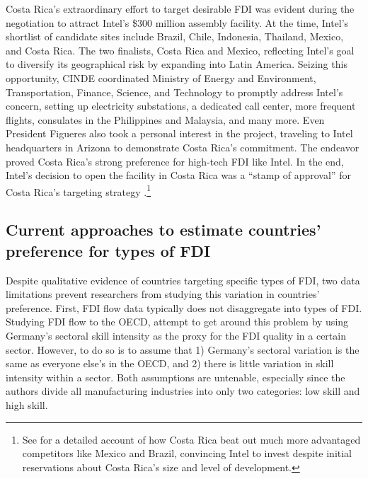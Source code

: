 Costa Rica's extraordinary effort to target desirable FDI was evident during the
negotiation to attract Intel's \$300 million assembly facility. At the time,
Intel's shortlist of candidate sites include Brazil, Chile, Indonesia, Thailand,
Mexico, and Costa Rica. The two finalists, Costa Rica and Mexico, reflecting
Intel's goal to diversify its geographical risk by expanding into Latin America.
Seizing this opportunity, CINDE coordinated Ministry of Energy and Environment,
Transportation, Finance, Science, and Technology to promptly address Intel's
concern, setting up electricity substations, a dedicated call center,
more frequent flights, consulates in the Philippines and Malaysia, and many
more. Even President Figueres also took a personal interest in the project,
traveling to Intel headquarters in Arizona to demonstrate Costa Rica's
commitment. The endeavor proved Costa Rica's strong preference for high-tech FDI
like Intel. In the end, Intel's decision to open the facility in Costa Rica was
a ``stamp of approval'' for Costa Rica's targeting strategy
\citep[511]{Mortimore2004}.\footnote{See \citet{Spar1998} for a detailed account
  of how Costa Rica beat out much more advantaged competitors like Mexico and
  Brazil, convincing Intel to invest despite initial reservations about Costa
  Rica's size and level of development.}

\subsection{Current approaches to estimate countries' preference for types of
  FDI}

Despite qualitative evidence of countries targeting specific types of FDI, two
data limitations prevent researchers from studying this variation in countries'
preference. First, FDI flow data typically does not disaggregate into types of
FDI. Studying FDI flow to the OECD, \citet{Alfaro2007} attempt to get around
this problem by using Germany's sectoral skill intensity as the proxy for the
FDI quality in a certain sector. However, to do so is to assume that 1)
Germany's sectoral variation is the same as everyone else's in the OECD, and 2)
there is little variation in skill intensity within a sector. Both assumptions
are untenable, especially since the authors divide all manufacturing industries
into only two categories: low skill and high skill.

